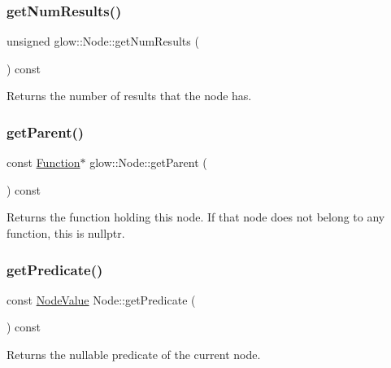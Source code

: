 \subsubsection{\texorpdfstring{get\+Num\+Results()}{getNumResults()}}
{\footnotesize\ttfamily unsigned glow\+::\+Node\+::get\+Num\+Results (\begin{DoxyParamCaption}{ }\end{DoxyParamCaption}) const\hspace{0.3cm}{\ttfamily [inline]}}

\begin{DoxyReturn}{Returns}
the number of results that the node has. 
\end{DoxyReturn}
\mbox{\label{classglow_1_1_node_a11974fd21979f60789e6c02533e17fda}} 
\subsubsection{\texorpdfstring{get\+Parent()}{getParent()}}
{\footnotesize\ttfamily const \hyperlink{classglow_1_1_function}{Function}$\ast$ glow\+::\+Node\+::get\+Parent (\begin{DoxyParamCaption}{ }\end{DoxyParamCaption}) const\hspace{0.3cm}{\ttfamily [inline]}}

\begin{DoxyReturn}{Returns}
the function holding this node. If that node does not belong to any function, this is nullptr. 
\end{DoxyReturn}
\mbox{\label{classglow_1_1_node_aa8d2dcebd65cef8d43ca2e90f3b59d05}} 
\subsubsection{\texorpdfstring{get\+Predicate()}{getPredicate()}}
{\footnotesize\ttfamily const \hyperlink{structglow_1_1_node_value}{Node\+Value} Node\+::get\+Predicate (\begin{DoxyParamCaption}{ }\end{DoxyParamCaption}) const}

\begin{DoxyReturn}{Returns}
the nullable predicate of the current node. 
\end{DoxyReturn}
\mbox{\label{classglow_1_1_node_a5fbfc4b0def2722bb3b8a18499111d69}} 
